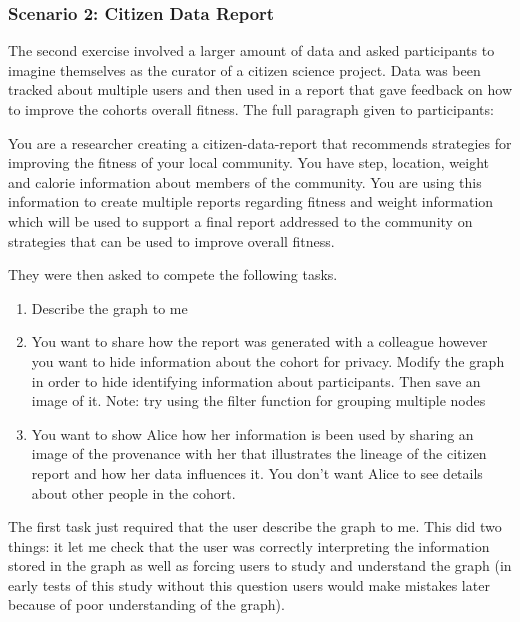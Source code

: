 \subsubsection{Scenario 2: Citizen Data Report}
\label{ssub:Scenario 2: Citizen Data Report}

The second exercise involved a larger amount of data and asked participants to imagine themselves as the curator of a citizen science project. Data was been tracked about multiple users and then used in a report that gave feedback on how to improve the cohorts overall fitness. The full paragraph given to participants:

\begin{absolutelynopagebreak}
\begin{framed}
You are a researcher creating a citizen-data-report that recommends strategies for improving the fitness of your local community. You have step, location, weight and calorie information about members of the community. You are using this information to create multiple reports regarding fitness and weight information which will be used to support a final report addressed to the community on strategies that can be used to improve overall fitness. 
\end{framed}
\end{absolutelynopagebreak}

They were then asked to compete the following tasks. 

\begin{enumerate}
	\item Describe the graph to me
	\item You want to share how the report was generated with a colleague however you want to hide information about the cohort for privacy. Modify the graph in order to hide identifying information about participants. Then save an image of it. Note: try using the filter function for grouping multiple nodes
	\item You want to show Alice how her information is been used by sharing an image of the provenance with her that illustrates the lineage of the citizen report and how her data influences it. You don’t want Alice to see details about other people in the cohort. 
\end{enumerate}

The first task just required that the user describe the graph to me. This did two things: it let me check that the user was correctly interpreting the information stored in the graph as well as forcing users to study and understand the graph (in early tests of this study without this question users would make mistakes later because of poor understanding of the graph).

